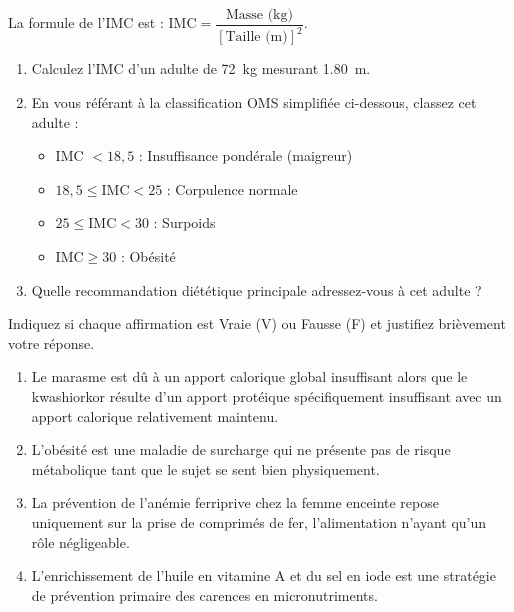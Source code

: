 \documentclass[11pt]{article}
\begin{document}
\begin{exercice}
La formule de l'IMC est : $\text{IMC} = \dfrac{\text{Masse (kg)}}{[\text{Taille (m)}]^2}$.
\begin{enumerate}
\item Calculez l'IMC d'un adulte de \SI{72}{kg} mesurant \SI{1,80}{m}.
\item En vous référant à la classification OMS simplifiée ci-dessous, classez cet adulte :
\begin{itemize}
    \item IMC $< 18,5$ : Insuffisance pondérale (maigreur)
    \item $18,5 \le \text{IMC} < 25$ : Corpulence normale
    \item $25 \le \text{IMC} < 30$ : Surpoids
    \item $\text{IMC} \ge 30$ : Obésité
\end{itemize}
\item Quelle recommandation diététique principale adressez-vous à cet adulte ?
\end{enumerate}
\end{exercice}

\begin{exercice}
Indiquez si chaque affirmation est Vraie (V) ou Fausse (F) et justifiez brièvement votre réponse.
\begin{enumerate}
\item Le marasme est dû à un apport calorique global insuffisant alors que le kwashiorkor résulte d'un apport protéique spécifiquement insuffisant avec un apport calorique relativement maintenu.
\item L'obésité est une maladie de surcharge qui ne présente pas de risque métabolique tant que le sujet se sent bien physiquement.
\item La prévention de l'anémie ferriprive chez la femme enceinte repose uniquement sur la prise de comprimés de fer, l'alimentation n'ayant qu'un rôle négligeable.
\item L'enrichissement de l'huile en vitamine A et du sel en iode est une stratégie de prévention primaire des carences en micronutriments.
\end{enumerate}
\end{exercice}
\end{document}
